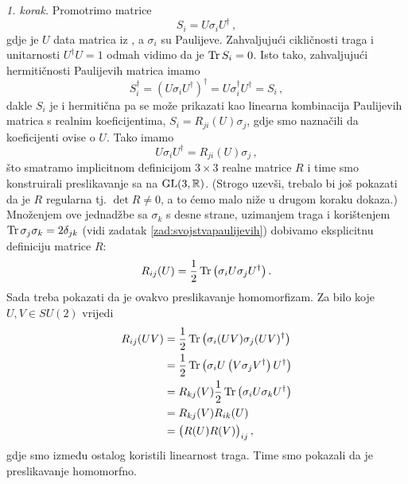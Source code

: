 \emph{1. korak.} Promotrimo matrice
\begin{equation}
    S_{i} = U \sigma_i U^\dagger \,,
\end{equation}
gdje je $U$ data matrica iz , a $\sigma_i$ su Paulijeve.
Zahvaljujući cikličnosti traga i unitarnosti $U^\dagger U = 1$ odmah vidimo da je
$\operatorname{Tr} S_i = 0$. Isto tako, zahvaljujući hermitičnosti Paulijevih
matrica imamo
\begin{equation}
    S_{i}^{\dagger} = (U \sigma_i U^\dagger)^\dagger = U \sigma_{i}^\dagger U^\dagger
    = S_{i} \,,
\end{equation}
dakle $S_{i}$ je i hermitična pa se može prikazati kao linearna kombinacija
Paulijevih matrica s realnim koeficijentima, $S_{i} = R_{ji}(U) \sigma_j$,
gdje smo naznačili da koeficijenti ovise o $U$. Tako imamo
\begin{equation}
    U \sigma_i U^\dagger = R_{ji}(U) \sigma_j \,,
    \label{eq:defRimp}
\end{equation}
što smatramo implicitnom definicijom $3 \times 3$ realne matrice $R$ i time smo konstruirali
preslikavanje sa  na $\mathrm{GL}(3, \mathbb{R})$. (Strogo uzevši, trebalo bi još pokazati da je $R$
regularna tj. $\det R \neq 0$, a to ćemo malo niže u drugom koraku dokaza.)
Množenjem ove jednadžbe sa $\sigma_{k}$ s desne strane, uzimanjem traga i korištenjem
$\operatorname{Tr} \sigma_{j}\sigma_{k} = 2\delta_{jk}$ (vidi zadatak \ref{zad:svojstvapaulijevih})
dobivamo eksplicitnu definiciju matrice $R$:
\begin{equation}
    R_{ij}(U) = \frac{1}{2} \operatorname{Tr}\left(\sigma_i U \sigma_j U^\dagger \right).
    \label{eq:defReksp}
\end{equation}
Sada treba pokazati da je ovakvo preslikavanje homomorfizam.
Za bilo koje $U, V \in SU(2)$ vrijedi
\begin{align}
    R_{ij}(UV)& = \frac{1}{2} \operatorname{Tr}\left( \sigma_i (UV) \sigma_j (UV)^\dagger \right) \\
              & = \frac{1}{2} \operatorname{Tr}\left(\sigma_i U \left(V  \sigma_j V^\dagger\right) U^\dagger\right) \\
              & = R_{kj}(V)\frac{1}{2} \operatorname{Tr}\left(\sigma_i U \sigma_k U^\dagger \right) \\
              & = R_{kj}(V) R_{ik}(U) \\
              & = \big(R(U) R(V) \big)_{ij}\,,
\end{align}
gdje smo između ostalog koristili linearnost traga. Time smo pokazali
da je preslikavanje homomorfno.


